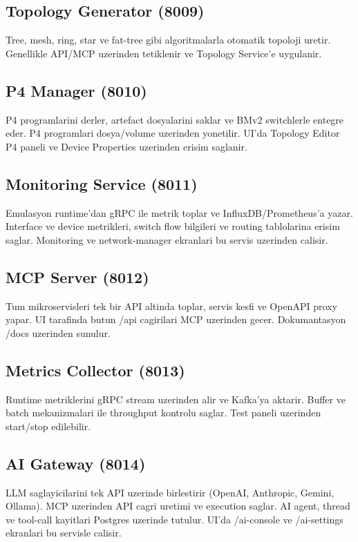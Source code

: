 \documentclass[conference]{IEEEtran}
\begin{document}
\subsection{Topology Generator (8009)}
Tree, mesh, ring, star ve fat-tree gibi algoritmalarla otomatik topoloji uretir. Genellikle API/MCP uzerinden tetiklenir ve Topology Service’e uygulanir.

\subsection{P4 Manager (8010)}
P4 programlarini derler, artefact dosyalarini saklar ve BMv2 switchlerle entegre eder. P4 programlari dosya/volume uzerinden yonetilir. UI’da Topology Editor P4 paneli ve Device Properties uzerinden erisim saglanir.

\subsection{Monitoring Service (8011)}
Emulasyon runtime’dan gRPC ile metrik toplar ve InfluxDB/Prometheus’a yazar. Interface ve device metrikleri, switch flow bilgileri ve routing tablolarina erisim saglar. Monitoring ve network-manager ekranlari bu servis uzerinden calisir.

\subsection{MCP Server (8012)}
Tum mikroservisleri tek bir API altinda toplar, servis kesfi ve OpenAPI proxy yapar. UI tarafinda butun /api cagirilari MCP uzerinden gecer. Dokumantasyon /docs uzerinden sunulur.

\subsection{Metrics Collector (8013)}
Runtime metriklerini gRPC stream uzerinden alir ve Kafka’ya aktarir. Buffer ve batch mekanizmalari ile throughput kontrolu saglar. Test paneli uzerinden start/stop edilebilir.

\subsection{AI Gateway (8014)}
LLM saglayicilarini tek API uzerinde birlestirir (OpenAI, Anthropic, Gemini, Ollama). MCP uzerinden API cagri uretimi ve execution saglar. AI agent, thread ve tool-call kayitlari Postgres uzerinde tutulur. UI’da /ai-console ve /ai-settings ekranlari bu servisle calisir.
\end{document}
